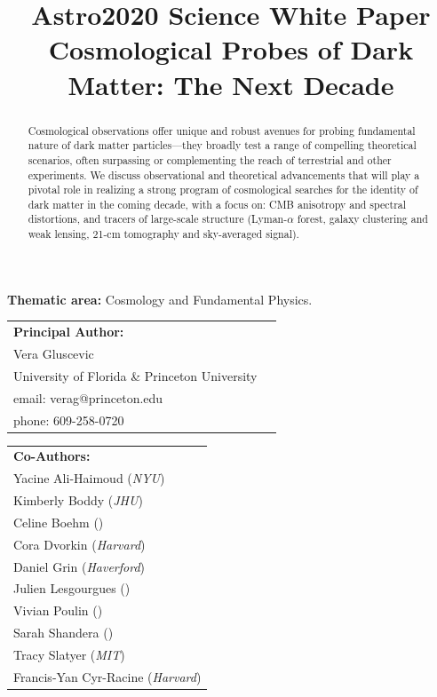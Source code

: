 \documentclass[12pt]{article}
\title{\textbf{Astro2020 Science White Paper}\\
\vspace{0.5cm}
Cosmological Probes of Dark Matter: The Next Decade}
\date{}
\author{}
\begin{document}
\maketitle
\vspace{-2cm}
\begin{center}
\textbf{Thematic area:} Cosmology and Fundamental Physics.     
\end{center}
\vspace{0.5cm}

{\begin{tabular}{ll}
\textbf{Principal Author:} \\
Vera Gluscevic & \\
University of Florida \& Princeton University & \\
email: verag@princeton.edu\\
phone: 609-258-0720 & 
\end{tabular}

\vspace{0.5cm}
{\begin{tabular}{l}
\textbf{Co-Authors:}\\
Yacine Ali-Haimoud (\textit{NYU})\\
Kimberly Boddy (\textit{JHU})\\
Celine Boehm (\textit{})\\
Cora Dvorkin (\textit{Harvard})\\
Daniel Grin (\textit{Haverford})\\
Julien Lesgourgues (\textit{})\\
Vivian Poulin (\textit{})\\
Sarah Shandera (\textit{})\\
Tracy Slatyer (\textit{MIT})\\
Francis-Yan Cyr-Racine (\textit{Harvard})\\
\end{tabular}}
}
\vspace{7mm}



\begin{abstract}
Cosmological observations offer unique and robust avenues for probing fundamental nature of dark matter particles---they broadly test a range of compelling theoretical scenarios, often surpassing or complementing the reach of terrestrial and other experiments.
We discuss observational and theoretical advancements that will play a pivotal role in realizing a strong program of cosmological searches for the identity of dark matter in the coming decade, with a focus on: CMB anisotropy and spectral distortions, and tracers of large-scale structure (Lyman-$\alpha$ forest, galaxy clustering and weak lensing, 21-cm tomography and sky-averaged signal).

\end{abstract}
\end{document}
